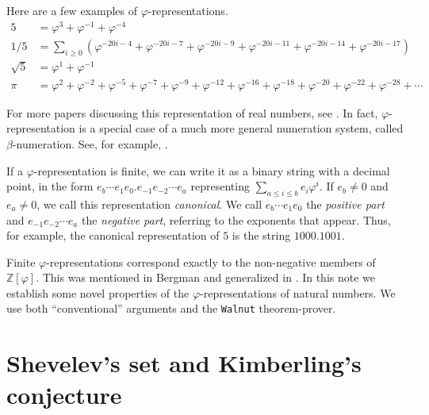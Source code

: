 \documentclass[12pt,reqno]{article}
\def\Zee{\mathbb{Z}}
\begin{document}
\begin{example}
Here are a few examples of $\varphi$-representations.
\begin{align*}
    5 &= \varphi^3 + \varphi^{-1} + \varphi^{-4} \\
    1/5 &= \sum_{i \geq 0} (\varphi^{-20i-4} + \varphi^{-20i-7} +
    \varphi^{-20i-9} +
    \varphi^{-20i-11} +
    \varphi^{-20i-14} +
    \varphi^{-20i-17} ) \\
    \sqrt{5} &= \varphi^1 + \varphi^{-1} \\
    \pi &= \varphi^2 + \varphi^{-2} +
    \varphi^{-5} + \varphi^{-7} + \varphi^{-9} + \varphi^{-12} +
    \varphi^{-16} + 
    \varphi^{-18} +
    \varphi^{-20} +
    \varphi^{-22} + 
    \varphi^{-28} + \cdots 
\end{align*}
\end{example}
For more papers discussing this representation of real numbers, see
\cite{Rousseau:1995,Frougny&Sakarovitch:1999,Sanchis&Sanchis:2001,Dekking:2020,Dekking:2020b,Dekking:2021,Dekking&vanLoon:2023,Dekking:2024,Dekking&vanLoon:2024}.  In fact, $\varphi$-representation is a special case of a much more general numeration system, called $\beta$-numeration.  See, for example, \cite{Renyi:1957,Parry:1960,Bertrand-Mathis:1989,Frougny:1992d,Frougny&Solomyak:1992}.

If a $\varphi$-representation is finite, we can write it as a binary string with a decimal point, in the form
$e_b \cdots e_1 e_0 . e_{-1} e_{-2}  \cdots e_{a}$
representing $\sum_{a \leq i \leq b} e_i \varphi^i$.
If $e_b \not=0$ and $e_a \not=0$, we call this
representation {\it canonical}.  We call $e_b \cdots e_1 e_0$ the {\it positive part}
and $e_{-1} e_{-2} \cdots e_a$ the {\it negative part}, referring to the exponents that appear.
Thus, for example,
the canonical representation of $5$ is the string $1000.1001$.  

Finite $\varphi$-representations correspond
exactly to the non-negative members of $\Zee[\varphi]$.  This was mentioned in Bergman \cite{Bergman:1957} and generalized in \cite{Frougny&Solomyak:1992}. 
In this note we establish some novel properties of the $\varphi$-representations of natural numbers.  We use both ``conventional'' arguments and the {\tt Walnut} theorem-prover.

\section{Shevelev's set and Kimberling's conjecture}
\end{document}
